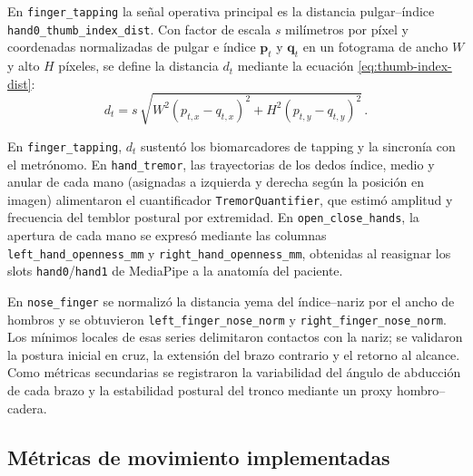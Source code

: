 En \texttt{finger\_tapping} la señal operativa principal es la distancia pulgar--índice \texttt{hand0\_\allowbreak{}thumb\_\allowbreak{}index\_\allowbreak{}dist}. Con factor de escala $s$ milímetros por píxel y coordenadas normalizadas de pulgar e índice $\mathbf{p}_t$ y $\mathbf{q}_t$ en un fotograma de ancho $W$ y alto $H$ píxeles, se define la distancia $d_t$ mediante la ecuación \ref{eq:thumb-index-dist}:
\begin{equation}
d_t = s \,\sqrt{W^2(p_{t,x}-q_{t,x})^2 + H^2(p_{t,y}-q_{t,y})^2}\,.
\label{eq:thumb-index-dist}
\end{equation}
\begin{sloppypar}
En \texttt{finger\_tapping}, $d_t$ sustentó los biomarcadores de tapping y la sincronía con el metrónomo. En \texttt{hand\_tremor}, las trayectorias de los dedos índice, medio y anular de cada mano (asignadas a izquierda y derecha según la posición en imagen) alimentaron el cuantificador \texttt{TremorQuantifier}, que estimó amplitud y frecuencia del temblor postural por extremidad. En \texttt{open\_close\_hands}, la apertura de cada mano se expresó mediante las columnas \texttt{left\_\allowbreak{}hand\_\allowbreak{}openness\_\allowbreak{}mm} y \texttt{right\_\allowbreak{}hand\_\allowbreak{}openness\_\allowbreak{}mm}, obtenidas al reasignar los slots \texttt{hand0}/\texttt{hand1} de MediaPipe a la anatomía del paciente.
\end{sloppypar}

En \texttt{nose\_finger} se normalizó la distancia yema del índice--nariz por el ancho de hombros y se obtuvieron \texttt{left\_\allowbreak{}finger\_\allowbreak{}nose\_\allowbreak{}norm} y \texttt{right\_\allowbreak{}finger\_\allowbreak{}nose\_\allowbreak{}norm}. Los mínimos locales de esas series delimitaron contactos con la nariz; se validaron la postura inicial en cruz, la extensión del brazo contrario y el retorno al alcance. Como métricas secundarias se registraron la variabilidad del ángulo de abducción de cada brazo y la estabilidad postural del tronco mediante un proxy hombro--cadera.

\subsection{Métricas de movimiento implementadas}

